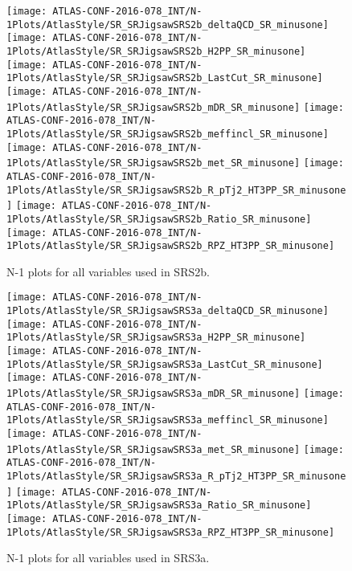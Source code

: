 \clearpage
\begin{figure}[tbp]
\begin{center}
\texttt{[image: ATLAS-CONF-2016-078\_INT/N-1Plots/AtlasStyle/SR\_SRJigsawSRS2b\_deltaQCD\_SR\_minusone]}
\texttt{[image: ATLAS-CONF-2016-078\_INT/N-1Plots/AtlasStyle/SR\_SRJigsawSRS2b\_H2PP\_SR\_minusone]}
\texttt{[image: ATLAS-CONF-2016-078\_INT/N-1Plots/AtlasStyle/SR\_SRJigsawSRS2b\_LastCut\_SR\_minusone]}
\texttt{[image: ATLAS-CONF-2016-078\_INT/N-1Plots/AtlasStyle/SR\_SRJigsawSRS2b\_mDR\_SR\_minusone]}
\texttt{[image: ATLAS-CONF-2016-078\_INT/N-1Plots/AtlasStyle/SR\_SRJigsawSRS2b\_meffincl\_SR\_minusone]}
\texttt{[image: ATLAS-CONF-2016-078\_INT/N-1Plots/AtlasStyle/SR\_SRJigsawSRS2b\_met\_SR\_minusone]}
\texttt{[image: ATLAS-CONF-2016-078\_INT/N-1Plots/AtlasStyle/SR\_SRJigsawSRS2b\_R\_pTj2\_HT3PP\_SR\_minusone]}
\texttt{[image: ATLAS-CONF-2016-078\_INT/N-1Plots/AtlasStyle/SR\_SRJigsawSRS2b\_Ratio\_SR\_minusone]}
\texttt{[image: ATLAS-CONF-2016-078\_INT/N-1Plots/AtlasStyle/SR\_SRJigsawSRS2b\_RPZ\_HT3PP\_SR\_minusone]}
\end{center}
\caption{N-1 plots for all variables used in SRS2b.}
\label{fig:SR_SRJigsawSRS2a_meffincl_SR_minusone}
\end{figure}

\begin{figure}[tbp]
\begin{center}
\texttt{[image: ATLAS-CONF-2016-078\_INT/N-1Plots/AtlasStyle/SR\_SRJigsawSRS3a\_deltaQCD\_SR\_minusone]}
\texttt{[image: ATLAS-CONF-2016-078\_INT/N-1Plots/AtlasStyle/SR\_SRJigsawSRS3a\_H2PP\_SR\_minusone]}
\texttt{[image: ATLAS-CONF-2016-078\_INT/N-1Plots/AtlasStyle/SR\_SRJigsawSRS3a\_LastCut\_SR\_minusone]}
\texttt{[image: ATLAS-CONF-2016-078\_INT/N-1Plots/AtlasStyle/SR\_SRJigsawSRS3a\_mDR\_SR\_minusone]}
\texttt{[image: ATLAS-CONF-2016-078\_INT/N-1Plots/AtlasStyle/SR\_SRJigsawSRS3a\_meffincl\_SR\_minusone]}
\texttt{[image: ATLAS-CONF-2016-078\_INT/N-1Plots/AtlasStyle/SR\_SRJigsawSRS3a\_met\_SR\_minusone]}
\texttt{[image: ATLAS-CONF-2016-078\_INT/N-1Plots/AtlasStyle/SR\_SRJigsawSRS3a\_R\_pTj2\_HT3PP\_SR\_minusone]}
\texttt{[image: ATLAS-CONF-2016-078\_INT/N-1Plots/AtlasStyle/SR\_SRJigsawSRS3a\_Ratio\_SR\_minusone]}
\texttt{[image: ATLAS-CONF-2016-078\_INT/N-1Plots/AtlasStyle/SR\_SRJigsawSRS3a\_RPZ\_HT3PP\_SR\_minusone]}
\end{center}
\caption{N-1 plots for all variables used in SRS3a.}
\label{fig:SR_SRJigsawSRS2b_H2PP_SR_minusone}
\end{figure}

